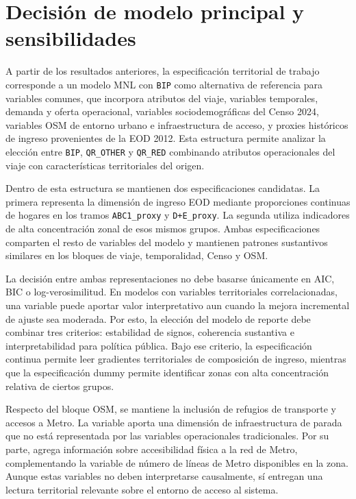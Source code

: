 \section{Decisión de modelo principal y sensibilidades}

A partir de los resultados anteriores, la especificación territorial de trabajo corresponde a un
modelo MNL con \texttt{BIP} como alternativa de referencia para variables comunes, que incorpora
atributos del viaje, variables temporales, demanda y oferta operacional, variables
sociodemográficas del Censo 2024, variables OSM de entorno urbano e infraestructura de acceso, y
proxies históricos de ingreso provenientes de la EOD 2012. Esta estructura permite analizar la
elección entre \texttt{BIP}, \texttt{QR\_OTHER} y \texttt{QR\_RED} combinando atributos
operacionales del viaje con características territoriales del origen.

Dentro de esta estructura se mantienen dos especificaciones candidatas. La primera representa la
dimensión de ingreso EOD mediante proporciones continuas de hogares en los tramos
\texttt{ABC1\_proxy} y \texttt{D+E\_proxy}. La segunda utiliza indicadores de alta concentración
zonal de esos mismos grupos. Ambas especificaciones comparten el resto de variables del modelo y
mantienen patrones sustantivos similares en los bloques de viaje, temporalidad, Censo y OSM.

La decisión entre ambas representaciones no debe basarse únicamente en AIC, BIC o
log-verosimilitud. En modelos con variables territoriales correlacionadas, una variable puede aportar
valor interpretativo aun cuando la mejora incremental de ajuste sea moderada. Por esto, la elección
del modelo de reporte debe combinar tres criterios: estabilidad de signos, coherencia sustantiva e
interpretabilidad para política pública. Bajo ese criterio, la especificación continua permite leer
gradientes territoriales de composición de ingreso, mientras que la especificación dummy permite
identificar zonas con alta concentración relativa de ciertos grupos.

Respecto del bloque OSM, se mantiene la inclusión de refugios de transporte y accesos a Metro. La
variable  aporta una dimensión de infraestructura de
parada que no está representada por las variables operacionales tradicionales. Por su parte,
 agrega información sobre accesibilidad física a la
red de Metro, complementando la variable de número de líneas de Metro disponibles en la zona. Aunque
estas variables no deben interpretarse causalmente, sí entregan una lectura territorial relevante
sobre el entorno de acceso al sistema.

